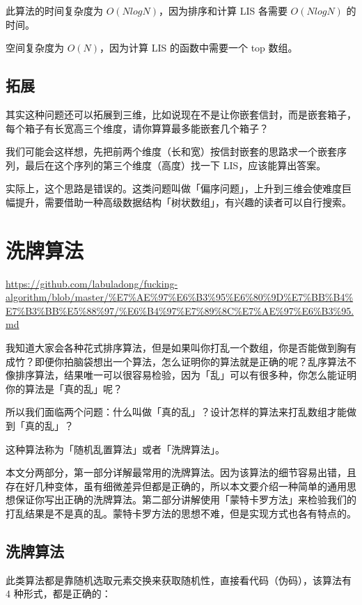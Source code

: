 \documentclass[12pt]{article}
\begin{document}
此算法的时间复杂度为 $O(NlogN)$，因为排序和计算 LIS 各需要 $O(NlogN)$ 的时间。

空间复杂度为 $O(N)$，因为计算 LIS 的函数中需要一个 top 数组。

\subsection{拓展}
其实这种问题还可以拓展到三维，比如说现在不是让你嵌套信封，而是嵌套箱子，每个箱子有长宽高三个维度，请你算算最多能嵌套几个箱子？

我们可能会这样想，先把前两个维度（长和宽）按信封嵌套的思路求一个嵌套序列，最后在这个序列的第三个维度（高度）找一下 LIS，应该能算出答案。

实际上，这个思路是错误的。这类问题叫做「偏序问题」，上升到三维会使难度巨幅提升，需要借助一种高级数据结构「树状数组」，有兴趣的读者可以自行搜索。

\section{洗牌算法}
\url{https://github.com/labuladong/fucking-algorithm/blob/master/%E7%AE%97%E6%B3%95%E6%80%9D%E7%BB%B4%E7%B3%BB%E5%88%97/%E6%B4%97%E7%89%8C%E7%AE%97%E6%B3%95.md}

我知道大家会各种花式排序算法，但是如果叫你打乱一个数组，你是否能做到胸有成竹？即便你拍脑袋想出一个算法，怎么证明你的算法就是正确的呢？乱序算法不像排序算法，结果唯一可以很容易检验，因为「乱」可以有很多种，你怎么能证明你的算法是「真的乱」呢？

所以我们面临两个问题：什么叫做「真的乱」？设计怎样的算法来打乱数组才能做到「真的乱」？

这种算法称为「随机乱置算法」或者「洗牌算法」。

本文分两部分，第一部分详解最常用的洗牌算法。因为该算法的细节容易出错，且存在好几种变体，虽有细微差异但都是正确的，所以本文要介绍一种简单的通用思想保证你写出正确的洗牌算法。第二部分讲解使用「蒙特卡罗方法」来检验我们的打乱结果是不是真的乱。蒙特卡罗方法的思想不难，但是实现方式也各有特点的。

\subsection{洗牌算法}
此类算法都是靠随机选取元素交换来获取随机性，直接看代码（伪码），该算法有 4 种形式，都是正确的：
\end{document}
